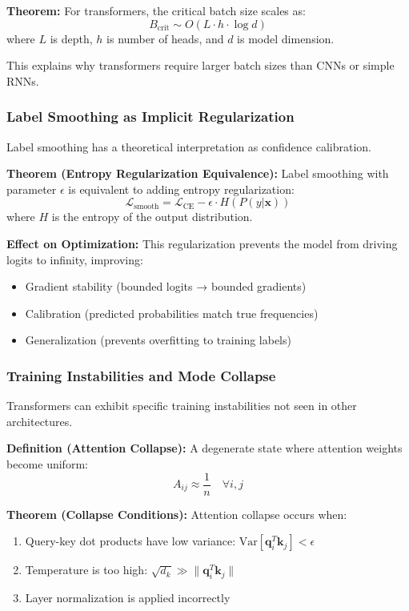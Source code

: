 \documentclass[11pt]{article}
\begin{document}
\textbf{Theorem:} For transformers, the critical batch size scales as:
\begin{equation}
B_{\text{crit}} \sim O(L \cdot h \cdot \log d)
\end{equation}
where $L$ is depth, $h$ is number of heads, and $d$ is model dimension.

This explains why transformers require larger batch sizes than CNNs or simple RNNs.

\subsubsection{Label Smoothing as Implicit Regularization}

Label smoothing has a theoretical interpretation as confidence calibration.

\textbf{Theorem (Entropy Regularization Equivalence):} Label smoothing with parameter $\epsilon$ is equivalent to adding entropy regularization:
\begin{equation}
\mathcal{L}_{\text{smooth}} = \mathcal{L}_{\text{CE}} - \epsilon \cdot H(P(y|\mathbf{x}))
\end{equation}
where $H$ is the entropy of the output distribution.

\textbf{Effect on Optimization:} This regularization prevents the model from driving logits to infinity, improving:
\begin{itemize}
    \item Gradient stability (bounded logits → bounded gradients)
    \item Calibration (predicted probabilities match true frequencies)
    \item Generalization (prevents overfitting to training labels)
\end{itemize}

\subsubsection{Training Instabilities and Mode Collapse}

Transformers can exhibit specific training instabilities not seen in other architectures.

\textbf{Definition (Attention Collapse):} A degenerate state where attention weights become uniform:
\begin{equation}
A_{ij} \approx \frac{1}{n} \quad \forall i,j
\end{equation}

\textbf{Theorem (Collapse Conditions):} Attention collapse occurs when:
\begin{enumerate}
    \item Query-key dot products have low variance: $\text{Var}[\mathbf{q}_i^T\mathbf{k}_j] < \epsilon$
    \item Temperature is too high: $\sqrt{d_k} \gg \|\mathbf{q}_i^T\mathbf{k}_j\|$
    \item Layer normalization is applied incorrectly
\end{enumerate}
\end{document}
